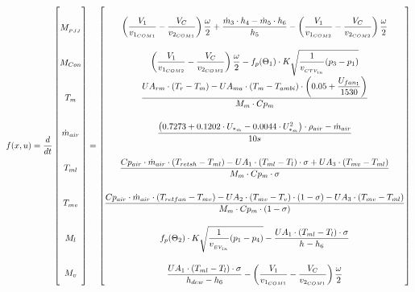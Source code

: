 \begin{equation} \label{eq:f_Sub} \renewcommand{\arraystretch}{3.4}
	f(x,u) =   \dfrac{d}{dt} \begin{bmatrix}
		M_{_{PJJ}}		\\				%
		M_{Con} 		\\				%
		T_m 			\\				%
		\dot{m}_{air}	\\				%
		T_{ml}			\\				%
		T_{mv}			\\				%
		M_l				\\				%
		M_v				\\				%
	\end{bmatrix}
	=
	\begin{bmatrix}
		\left(\dfrac{V_1}{v_{1_{COM1}}} - \dfrac{V_C}{v_{2_{COM1}}}\right) \dfrac{\omega}{2} + \dfrac{\dot{m}_{3} \cdot h_4 - \dot{m}_{5} \cdot h_6}{h_5} - \left(\dfrac{V_1}{v_{1_{COM2}}} - \dfrac{V_C}{v_{2_{COM2}}}\right) \dfrac{\omega}{2} \\										%
		\left(\dfrac{V_1}{v_{1_{COM2}}} - \dfrac{V_C}{v_{2_{COM2}}}\right) \dfrac{\omega}{2} - f_p(\Theta_1) \cdot K  \sqrt{\dfrac{1}{v_{_{CTV_{in}}}} (p_{3} - p_{1})}	\\												%
		\dfrac{U A_{rm} \cdot (T_r - T_m) - U A_{ma} \cdot (T_m - T_{ambi})\cdot \left(0.05 + \dfrac{U_{fan_1}}{1530}\right)}{M_m \cdot Cp_m} \\									%
		\dfrac{\left( 0.7273 + 0.1202 \cdot U_{*_{\dot{m}}}  -0.0044 \cdot	U_{*_{\dot{m}}}^2 \right) \cdot \rho_{air}  - \dot{m}_{air}} {10s}		\\					%
		\dfrac{Cp_{air} \cdot \dot{m}_{air} \cdot (T_{retsh} - T_{ml})-U A_1 \cdot (T_{ml} - T_l) \cdot \sigma + U A_3 \cdot (T_{mv} - T_{ml})}{M_m \cdot Cp_m \cdot \sigma}        \\	%
		\dfrac{Cp_{air} \cdot \dot{m}_{air} \cdot (T_{retfan} - T_{mv}) - U A_2 \cdot (T_{mv} - T_v) \cdot (1- \sigma) - U A_3 \cdot (T_{mv} - T_{ml})}{M_m \cdot Cp_m \cdot (1- \sigma)}	\\	%
		f_p(\Theta_2) \cdot K  \sqrt{\dfrac{1}{v_{_{EV_{in}}}} (p_{1} - p_{4})} - \dfrac{U A_1 \cdot (T_{ml} - T_l) \cdot \sigma}{h_{} - h_{6}}		\\											%
		\dfrac{U A_1 \cdot (T_{ml} - T_l) \cdot \sigma}{h_{dew} - h_{6}} - \left(\dfrac{V_1}{v_{1_{COM1}}} - \dfrac{V_C}{v_{2_{COM1}}}\right) \dfrac{\omega}{2}	\\												%
	\end{bmatrix}
\end{equation}





